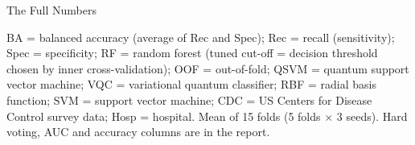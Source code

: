 \begin{frame}{The Full Numbers}
  \vfill
  {\tiny BA = balanced accuracy (average of Rec and Spec); Rec = recall (sensitivity); Spec = specificity; RF = random forest (tuned cut-off = decision threshold chosen by inner cross-validation); OOF = out-of-fold; QSVM = quantum support vector machine; VQC = variational quantum classifier; RBF = radial basis function; SVM = support vector machine; CDC = US Centers for Disease Control survey data; Hosp = hospital. Mean of 15 folds (5 folds $\times$ 3 seeds). Hard voting, AUC and accuracy columns are in the report.}
\end{frame}

